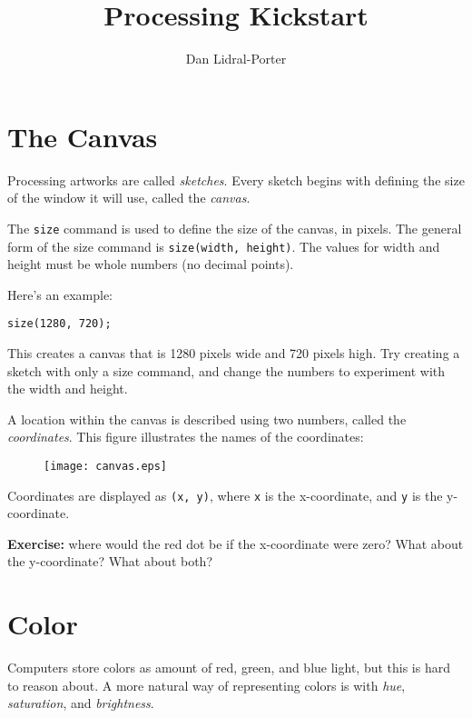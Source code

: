 \documentclass[
]{leaflet}
\title{Processing Kickstart\vspace{-2ex}}
\author{%
  Dan Lidral-Porter\vspace{-2ex}
}
\date{}
\begin{document}


\maketitle
\thispagestyle{empty}


\section{The Canvas}

Processing artworks are called \textit{sketches}.
Every sketch begins with defining the size of the window it will use, called the \textit{canvas}.

The \texttt{size} command is used to define the size of the canvas, in pixels.
The general form of the size command is \texttt{size(width, height)}.
The values for width and height must be whole numbers (no decimal points).

Here's an example:

\begin{lstlisting}
size(1280, 720);
\end{lstlisting}

This creates a canvas that is 1280 pixels wide and 720 pixels high.
Try creating a sketch with only a size command, and change the numbers to experiment with the width and height.

A location within the canvas is described using two numbers, called the \textit{coordinates}.
This figure illustrates the names of the coordinates:

\begin{figure}[!h]
  \centering
  \texttt{[image: canvas.eps]}
\end{figure}

Coordinates are displayed as \texttt{(x, y)}, where \texttt{x} is the x-coordinate, and \texttt{y} is the y-coordinate.

\textbf{Exercise:} where would the red dot be if the x-coordinate were zero?
What about the y-coordinate?
What about both?

\section{Color}

Computers store colors as amount of red, green, and blue light, but this is hard to reason about.
A more natural way of representing colors is with \textit{hue}, \textit{saturation}, and \textit{brightness}.
\end{document}

